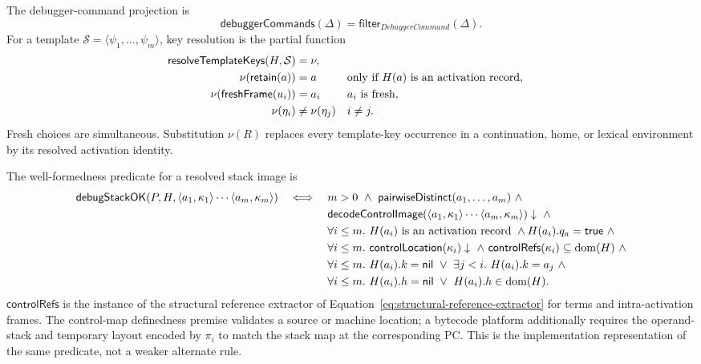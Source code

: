 The debugger-command projection is
\begin{equation}\label{eq:debugger-command-projection}
 \mathsf{debuggerCommands}(\Delta)=
   \mathsf{filter}_{\mathit{DebuggerCommand}}(\Delta).
\end{equation}
For a template $\mathcal S=\langle\psi_1,\ldots,\psi_m\rangle$, key
resolution is the partial function
\begin{equation}\label{eq:resolve-stack-template-keys}
\begin{aligned}
 \mathsf{resolveTemplateKeys}(H,\mathcal S)&=\nu,\\
 \nu(\mathsf{retain}(a))&=a
   &&\text{only if }H(a)\text{ is an activation record},\\
 \nu(\mathsf{freshFrame}(u_i))&=a_i
   &&a_i\text{ is fresh},\\
 \nu(\eta_i)&\ne\nu(\eta_j)&&i\ne j.
\end{aligned}
\end{equation}
Fresh choices are simultaneous.  Substitution $\nu(R)$ replaces every
template-key occurrence in a continuation, home, or lexical environment by
its resolved activation identity.

The well-formedness predicate for a resolved stack image is
{\footnotesize
\begin{equation}\label{eq:debug-stack-image-validity}
\begin{split}
 \mathsf{debugStackOK}(P,H,
    \langle a_1,\kappa_1\rangle\cdots\langle a_m,\kappa_m\rangle)
 \quad\Longleftrightarrow\quad{}
 &m>0\ \land\ \mathsf{pairwiseDistinct}(a_1,\ldots,a_m)\ \land\\
 &\mathsf{decodeControlImage}
    (\langle a_1,\kappa_1\rangle\cdots\langle a_m,\kappa_m\rangle)
       \downarrow\ \land\\
 &\forall i\le m.\ H(a_i)\text{ is an activation record}\ \land
       H(a_i).q_a=\mathsf{true}\ \land\\
 &\forall i\le m.\ \mathsf{controlLocation}(\kappa_i)\downarrow
       \ \land\ \mathsf{controlRefs}(\kappa_i)\subseteq\mathop{\mathrm{dom}}(H)\ \land\\
 &\forall i\le m.\ H(a_i).k=\mathsf{nil}\ \lor\
       \exists j<i.\ H(a_i).k=a_j\ \land\\
 &\forall i\le m.\ H(a_i).h=\mathsf{nil}\ \lor\ H(a_i).h\in\mathop{\mathrm{dom}}(H).
\end{split}
\end{equation}
}
$\mathsf{controlRefs}$ is the instance of the structural reference extractor
of Equation~\eqref{eq:structural-reference-extractor} for terms and
intra-activation frames.  The control-map definedness premise validates a
source or machine location; a bytecode platform additionally requires the operand-stack and
temporary layout encoded by $\pi_i$ to match the stack map at the corresponding
PC.  This is the implementation representation of the same predicate, not a
weaker alternate rule.

